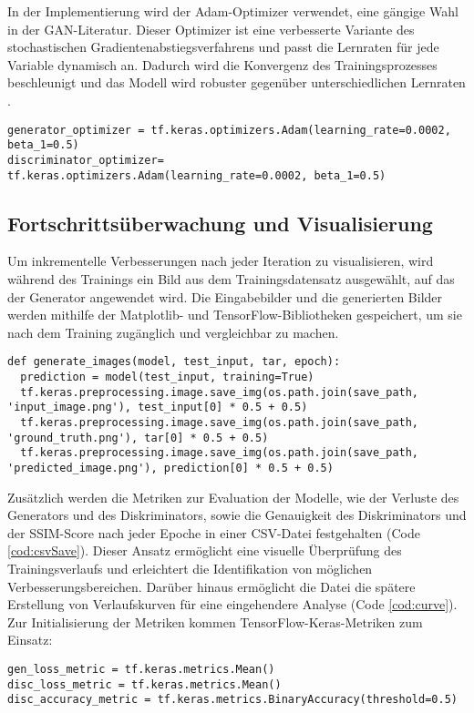 In der Implementierung wird der Adam-Optimizer verwendet, eine gängige Wahl in der GAN-Literatur. Dieser Optimizer ist eine verbesserte Variante des stochastischen Gradientenabstiegsverfahrens und passt die Lernraten für jede Variable dynamisch an. Dadurch wird die Konvergenz des Trainingsprozesses beschleunigt und das Modell wird robuster gegenüber unterschiedlichen Lernraten \cite{Kingma.2014}.
\newpage
\begin{lstlisting}[language=pyhaff, caption={Initialisierung der Adam-Optimizers aus der Pix2Pix Implementierung}, label={cod:optimizer}]
generator_optimizer = tf.keras.optimizers.Adam(learning_rate=0.0002, beta_1=0.5)
discriminator_optimizer= tf.keras.optimizers.Adam(learning_rate=0.0002, beta_1=0.5)
\end{lstlisting}

\subsection{Fortschrittsüberwachung und Visualisierung}
Um inkrementelle Verbesserungen nach jeder Iteration zu visualisieren, wird während des Trainings ein Bild aus dem Trainingsdatensatz ausgewählt, auf das der Generator angewendet wird. Die Eingabebilder und die generierten Bilder werden mithilfe der Matplotlib- und TensorFlow-Bibliotheken gespeichert, um sie nach dem Training zugänglich und vergleichbar zu machen. 

\begin{lstlisting}[language=pyhaff, caption={Speicherung der generierten Bilder}, label={cod:optimizer}]
def generate_images(model, test_input, tar, epoch):
  prediction = model(test_input, training=True)
  tf.keras.preprocessing.image.save_img(os.path.join(save_path, 'input_image.png'), test_input[0] * 0.5 + 0.5)
  tf.keras.preprocessing.image.save_img(os.path.join(save_path, 'ground_truth.png'), tar[0] * 0.5 + 0.5)
  tf.keras.preprocessing.image.save_img(os.path.join(save_path, 'predicted_image.png'), prediction[0] * 0.5 + 0.5)
\end{lstlisting}

Zusätzlich werden die Metriken zur Evaluation der Modelle, wie der Verluste des Generators und des Diskriminators, sowie die Genauigkeit des Diskriminators und der SSIM-Score nach jeder Epoche in einer CSV-Datei festgehalten (Code \ref{cod:csvSave}). Dieser Ansatz ermöglicht eine visuelle Überprüfung des Trainingsverlaufs und erleichtert die Identifikation von möglichen Verbesserungsbereichen.
Darüber hinaus ermöglicht die Datei die spätere Erstellung von Verlaufskurven für eine eingehendere Analyse (Code \ref{cod:curve}).
\newpage
Zur Initialisierung der Metriken kommen TensorFlow-Keras-Metriken zum Einsatz:
\begin{lstlisting}[language=pyhaff, caption={Initialisierung der Metriken}, label={cod:initMetrics}]
gen_loss_metric = tf.keras.metrics.Mean()
disc_loss_metric = tf.keras.metrics.Mean()
disc_accuracy_metric = tf.keras.metrics.BinaryAccuracy(threshold=0.5)
\end{lstlisting}

